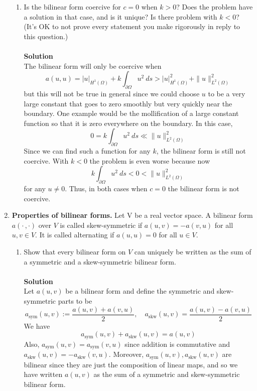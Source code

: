 \documentclass[11pt]{article}
\begin{document}
\begin{enumerate}
\begin{enumerate}



      \item Is the bilinear form coercive for $c=0$ when $k>0$? Does
        the problem have a solution in that case, and is it unique?
        Is there problem with $k<0$? (It's OK to not prove every
        statement you make rigorously in reply to this question.)\\
\\


{\bf Solution}\\
The bilinear form will only be coercive when
\[
a(u,u) = |u|_{H^1(\Omega)} + k\int_{\partial \Omega}u^2\ ds > |u|_{H^1(\Omega)}^2 + \|u\|_{L^2(\Omega)}^2
\]
but this will not be true in general since we could choose $u$ to be a very large constant that goes to zero smoothly but very quickly  near the boundary.  One example would be the mollification of a large constant function so that it is zero everywhere on the boundary.  In this case,
\[
0 = k\int_{\partial \Omega}u^2\ ds \ll \|u\|^2_{L^2(\Omega)}
\]
Since we can find such a function for any $k$, the bilinear form is still not coercive.  With $k < 0$ the problem is even worse because now 
\[
 k\int_{\partial \Omega}u^2\ ds < 0 <  \|u\|^2_{L^2(\Omega)}
\]
for any $u \neq 0$.  Thus, in both cases when $c = 0$ the bilinear form is not coercive.



    \end{enumerate}
\item {\bf Properties of bilinear forms.} Let V be a real vector
  space. A bilinear form $a(\cdot\,,\cdot)$ over $V$ is called
  skew-symmetric if $a(u,v)=-a(v,u)$ for all $u,v\in V$. It is called
  alternating if $a(u,u)=0$ for all $u\in V$.
  \begin{enumerate}
  \item Show that every bilinear form on $V$ can uniquely be written
    as the sum of a symmetric and a skew-symmetric bilinear form.\\
\\

{\bf Solution}\\
Let $a(u,v)$ be a bilinear form and define the symmetric and skew-symmetric parts to be
\[
a_{\mathrm{sym}}(u,v) := \frac{a(u,v) + a(v,u)}{2},\quad a_{\mathrm{skw}}(u,v) = \frac{a(u,v) - a(v,u)}{2}
\]
We have
\[
a_{\mathrm{sym}}(u,v) + a_{\mathrm{skw}}(u,v) = a(u,v)
\]
Also, $a_{\mathrm{sym}}(u,v) = a_{\mathrm{sym}}(v,u)$ since addition is commutative and $a_{\mathrm{skw}}(u,v) = -a_{\mathrm{skw}}(v,u)$.  Moreover, $a_{\mathrm{sym}}(u,v), a_{\mathrm{skw}}(u,v)$ are bilinear since they are just the composition of linear maps, and so we have written $a(u,v)$ as the sum of a symmetric and skew-symmetric bilinear form.



\end{enumerate}
\end{enumerate}
\end{document}
